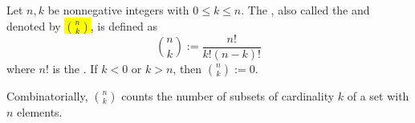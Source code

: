 \begin{definition} \label{definition:combinatorial_choose_function_binomial_coefficient}
    Let $n, k$ be nonnegative integers with $0 \leq k \leq n$. The , also called the  and denoted by \hl{$\binom{n}{k}$}, is defined as
    $$\binom{n}{k} := \frac{n!}{k!(n-k)!}$$
    where $n!$ is the . If $k < 0$ or $k > n$, then $\binom{n}{k} := 0$.

    Combinatorially, $\binom{n}{k}$ counts the number of subsets of cardinality $k$ of a set with $n$ elements.
\end{definition}
